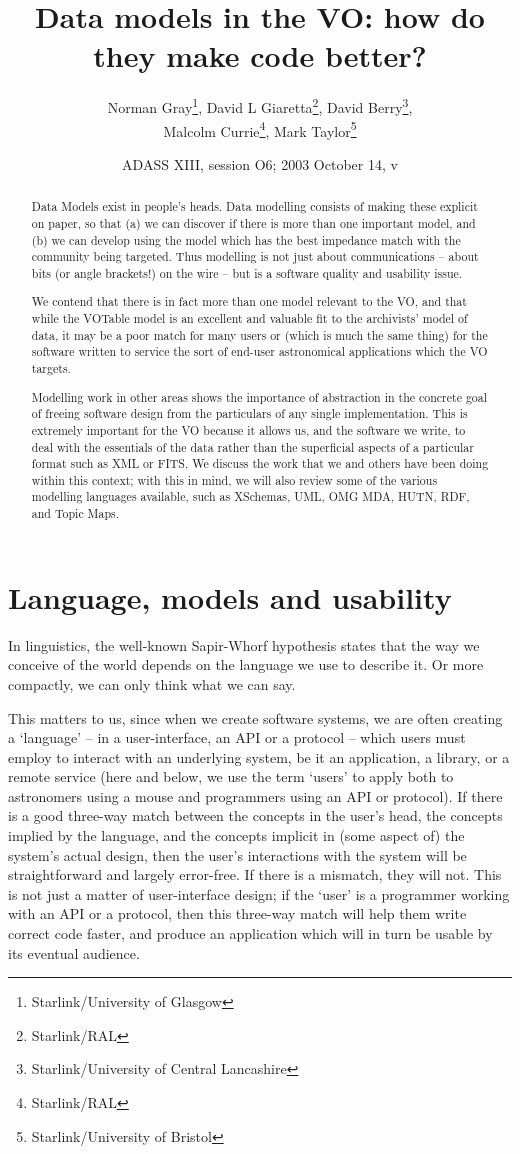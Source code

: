 \documentclass[a4paper]{article}
\title{Data models in the VO: how do they make code better?}
\author{Norman Gray\thanks{Starlink/University of Glasgow},
        David L Giaretta\thanks{Starlink/RAL},
        David Berry\thanks{Starlink/University of Central Lancashire},\\
        Malcolm Currie\thanks{Starlink/RAL}, 
        Mark Taylor\thanks{Starlink/University of Bristol}}
\date{ADASS XIII, session O6; 2003 October 14, v\RCSRevision}
\begin{document}
\maketitle

\begin{abstract}
Data Models exist in people's heads. Data modelling consists of making
these explicit on paper, so that (a) we can discover if there is more
than one important model, and (b) we can develop using the model which
has the best impedance match with the community being targeted. Thus
modelling is not just about communications -- about bits (or angle
brackets!) on the wire -- but is a software quality and usability
issue.

We contend that there is in fact more than one model relevant to the
VO, and that while the VOTable model is an excellent and valuable fit
to the archivists' model of data, it may be a poor match for many
users or (which is much the same thing) for the software written to
service the sort of end-user astronomical applications which the VO
targets.

Modelling work in other areas shows the importance of abstraction in
the concrete goal of freeing software design from the particulars of
any single implementation. This is extremely important for the VO
because it allows us, and the software we write, to deal with the
essentials of the data rather than the superficial aspects of a
particular format such as XML or FITS. We discuss the work that we and
others have been doing within this context; with this in mind, we will
also review some of the various modelling languages available, such as
XSchemas, UML, OMG MDA, HUTN, RDF, and Topic Maps.
\end{abstract}



\section{Language, models and usability}

In linguistics, the well-known Sapir-Whorf hypothesis states that the
way we conceive of the world depends on the language we use to
describe it.  Or more compactly, we can only think what we can
say.

This matters to us, since when we create software systems, we are
often creating a `language' -- in a user-interface, an API or a
protocol -- which users must employ to interact with an underlying
system, be it an application, a library, or a remote service (here and
below, we use the term `users' to apply both to astronomers using a
mouse and programmers using an API or protocol).  If there is a good
three-way match between the concepts in the user's head, the concepts
implied by the language, and the concepts implicit in (some aspect of)
the system's actual design, then the user's interactions with the
system will be straightforward and largely error-free.  If there is a
mismatch, they will not.  This is not just a matter of user-interface
design; if the `user' is a programmer working with an API or a
protocol, then this three-way match will help them write correct code
faster, and produce an application which will in turn be usable by its
eventual audience.
\end{document}
